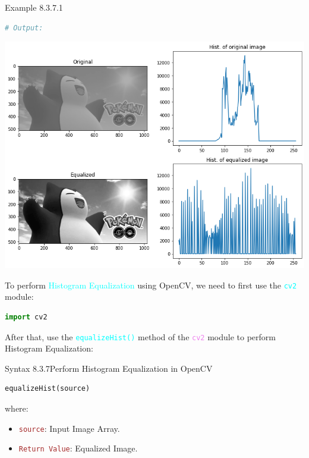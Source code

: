 \documentclass{book}
\begin{document}
\begin{egBox}{Example 8.3.7.1}{}
\begin{lstlisting}[language=Python, basicstyle=\ttfamily\small, keywordstyle=\color{blue}, commentstyle=\color{forestgreen}, stringstyle=\color{red}, showstringspaces=false]
# Output:
    \end{lstlisting}
    \begin{center}
        \includegraphics[scale=0.34]{chapter 8/hist_equalization.png}
    \end{center}
\end{egBox}
\newpage
To perform \textcolor{cyan}{Histogram Equalization} using OpenCV, we need to first use the \textcolor{cyan}{\texttt{cv2}} module:
\begin{lstlisting}[language=Python, basicstyle=\ttfamily\small, keywordstyle=\color{blue}, commentstyle=\color{forestgreen}, stringstyle=\color{red}, showstringspaces=false]
                                            import cv2
\end{lstlisting}
After that, use the \textcolor{cyan}{\texttt{equalizeHist()}} method of the \textcolor{violet}{\texttt{cv2}} module to perform Histogram Equalization:
\begin{synBox}{Syntax 8.3.7}{Perform Histogram Equalization in OpenCV}
    \begin{lstlisting}[language=Python, basicstyle=\ttfamily\small, keywordstyle=\color{blue}, commentstyle=\color{forestgreen}, stringstyle=\color{red}, showstringspaces=false]
                                        equalizeHist(source)
    \end{lstlisting}
    where:
    \begin{itemize}
        \item \textcolor{brown}{\texttt{source}}: Input Image Array.
        \item \textcolor{brown}{\texttt{Return Value}}: Equalized Image.
    \end{itemize}
\end{synBox}
\end{document}
